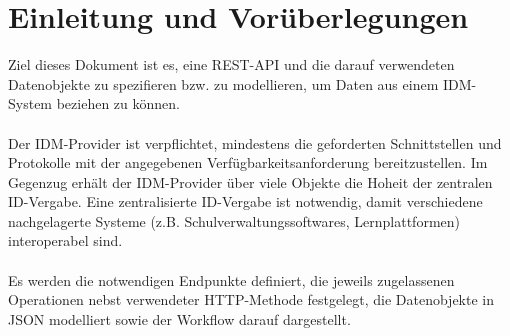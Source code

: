 \chapter{Einleitung und Vorüberlegungen}
Ziel dieses Dokument ist es, eine REST-API und die darauf verwendeten Datenobjekte zu spezifieren bzw. zu modellieren, um Daten aus einem IDM-System beziehen zu können.\\
\\
Der IDM-Provider ist verpflichtet, mindestens die geforderten Schnittstellen und Protokolle mit der angegebenen Verfügbarkeitsanforderung bereitzustellen. 
Im Gegenzug erhält der IDM-Provider über viele Objekte die Hoheit der zentralen ID-Vergabe. 
Eine zentralisierte ID-Vergabe ist notwendig, damit verschiedene nachgelagerte Systeme (z.B. Schulverwaltungssoftwares, Lernplattformen) interoperabel sind.\\
\\
Es werden die notwendigen Endpunkte definiert, die jeweils zugelassenen Operationen nebst verwendeter HTTP-Methode festgelegt, die Datenobjekte in JSON modelliert sowie der Workflow darauf dargestellt.

